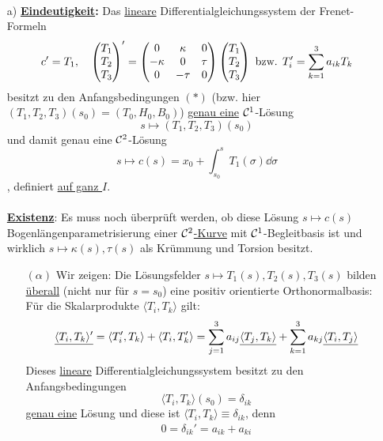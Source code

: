 \begin{beweis} \(\)
 \begin{enumerate}
  \item[a)] \textbf{\uline{Eindeutigkeit}:} Das \uline{lineare} Differentialgleichungssystem der Frenet-Formeln
  \begin{align*}
   c' = T_1, \quad \begin{pmatrix} T_1 \\ T_2 \\ T_3 \end{pmatrix} ' = \begin{pmatrix}
                            0 & \kappa & 0 \\
                            -\kappa & 0 &\tau \\
                            0 & -\tau & 0
                           \end{pmatrix} \begin{pmatrix} T_1 \\ T_2 \\ T_3 \end{pmatrix}  \text{ bzw. } T_i' = \sum_{k = 1}^3 a_{ik} T_k
  \end{align*}
  besitzt zu den Anfangsbedingungen \((\ast)\) \big(bzw. hier \((T_1, T_2, T_3)(s_0) = (T_0, H_0, B_0)\)\big) \uline{genau eine} \(\mathcal{C}^1\)-Lösung \[s \mapsto (T_1, T_2, T_3)(s_0)\] und damit genau eine \(\mathcal{C}^2\)-Lösung \[s \mapsto c(s) = x_0 + \int_{s_0}^s T_1(\sigma) \dd \sigma\], definiert \uline{auf ganz \(I\)}. \\\\
  \textbf{\uline{Existenz}}: Es muss noch überprüft werden, ob diese Lösung \(s \mapsto c(s)\) Bogenlängen\-para\-metri\-sierung einer \uline{\(\mathcal{C}^2\)-Kurve} mit \(\mathcal{C}^1\)-Begleitbasis ist und wirklich \(s \mapsto \kappa(s), \tau(s)\) als Krümmung und Torsion besitzt.
  \begin{enumerate}
  \item[\((\alpha)\)] Wir zeigen: Die Lösungsfelder \(s \mapsto T_1(s), T_2(s), T_3(s)\) bilden \uline{überall} (nicht nur für \(s = s_0\)) eine positiv orientierte Orthonormalbasis: \\
  Für die Skalarprodukte \(\langle T_i, T_k \rangle\) gilt:
  \begin{align*}
   \uline{\langle T_i, T_k \rangle'} = \langle T_i', T_k \rangle + \langle T_i, T_k' \rangle = \sum_{j = 1}^3 a_{ij} \uline{\langle T_j, T_k \rangle} + \sum_{k=1}^3 a_{kj} \uline{\langle T_i, T_j \rangle}
  \end{align*}
  Dieses \uline{lineare} Differentialgleichungssystem besitzt zu den Anfangsbedingungen \[\langle T_i, T_k \rangle(s_0) = \delta_{ik}\] \uline{genau eine} Lösung und diese ist \(\langle T_i, T_k \rangle \equiv \delta_{ik}\), denn
  \begin{align*}
   0 = \delta_{ik}' = a_{ik} + a_{ki}
  \end{align*}

\end{enumerate}
\end{enumerate}
\end{beweis}

